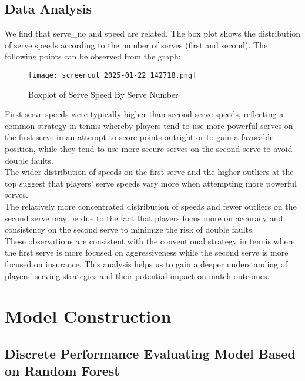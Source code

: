 \documentclass{mcmthesis}
\begin{document}
\subsection{Data Analysis}
We find that serve\_no and speed are related. The box plot shows the distribution of serve
speeds according to the number of serves (first and second). The following points can be observed
from the graph:

\begin{figure}[htbp]
    \centering
    \texttt{[image: screencut 2025-01-22 142718.png]}
    \caption{Boxplot of Serve Speed By Serve Number} \label{Figure 2}
\end{figure}

First serve speeds were typically higher than second serve speeds, reflecting a common
strategy in tennis whereby players tend to use more powerful serves on the first serve in an
attempt to score points outright or to gain a favorable position, while they tend to use more secure
serves on the second serve to avoid double faults.\\
The wider distribution of speeds on the first serve and the higher outliers at the top suggest
that players' serve speeds vary more when attempting more powerful serves. \\
The relatively more concentrated distribution of speeds and fewer outliers on the second
serve may be due to the fact that players focus more on accuracy and consistency on the second
serve to minimize the risk of double faults. \\
These observations are consistent with the conventional strategy in tennis where the first
serve is more focused on aggressiveness while the second serve is more focused on insurance. This analysis helps us to gain a deeper understanding of players' serving strategies and their
potential impact on match outcomes.
\section{Model Construction}

\subsection{Discrete Performance Evaluating Model Based on Random Forest}
\end{document}
